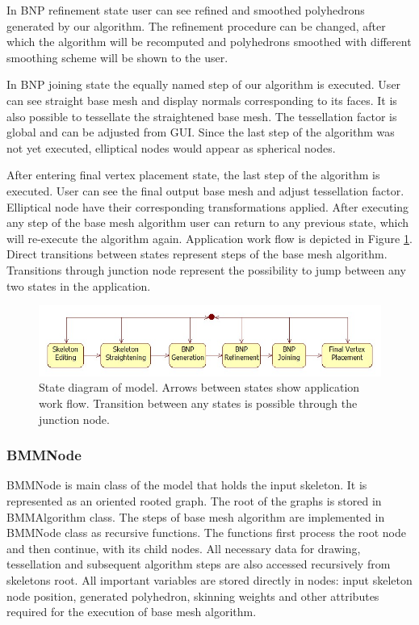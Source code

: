 In BNP refinement state user can see refined and smoothed polyhedrons generated by our algorithm.
The refinement procedure can be changed, after which the algorithm will be recomputed and polyhedrons smoothed with different smoothing scheme will be shown to the user.

In BNP joining state the equally named step of our algorithm is executed.
User can see straight base mesh and display normals corresponding to its faces.
It is also possible to tessellate the straightened base mesh.
The tessellation factor is global and can be adjusted from GUI.
Since the last step of the algorithm was not yet executed, elliptical nodes would appear as spherical nodes.

After entering final vertex placement state, the last step of the algorithm is executed.
User can see the final output base mesh and adjust tessellation factor.
Elliptical node have their corresponding transformations applied.
After executing any step of the base mesh algorithm user can return to any previous state, which will re-execute the algorithm again.
Application work flow is depicted in Figure \ref{fig:states}.
Direct transitions between states represent steps of the base mesh algorithm.
Transitions through junction node represent the possibility to jump between any two states in the application.

\begin{figure}[h]
    \centering
    \includegraphics[width=\textwidth]{images/states}
    \caption[Model state diagram]{State diagram of model. Arrows between states show application work flow. Transition between any states is possible through the junction node.}
    \label{fig:states}
\end{figure}

\subsubsection{BMMNode}

BMMNode is main class of the model that holds the input skeleton.
It is represented as an oriented rooted graph.
The root of the graphs is stored in BMMAlgorithm class.
The steps of base mesh algorithm are implemented in BMMNode class as recursive functions.
The functions first process the root node and then continue, with its child nodes.
All necessary data for drawing, tessellation and subsequent algorithm steps are also accessed recursively from skeletons root. All important variables are stored directly in nodes: input skeleton node position, generated polyhedron, skinning weights and other attributes required for the execution of base mesh algorithm.

